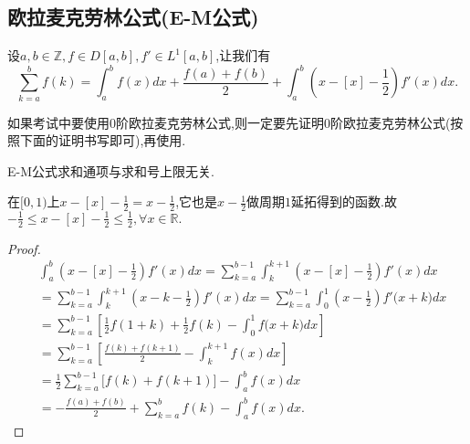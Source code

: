 \documentclass[lang=cn,newtx,10pt,scheme=chinese]{elegantbook}
\begin{document}
\subsection{欧拉麦克劳林公式(E-M公式)}


\begin{proposition}\label{proposition:0阶欧拉麦克劳林公式(0阶E-M公式)}
设\(a,b\in\mathbb{Z}, f\in D[a,b], f'\in L^1[a,b]\),让我们有
\[
\sum_{k = a}^{b}f(k)=\int_{a}^{b}f(x)dx+\frac{f(a)+f(b)}{2}+\int_{a}^{b}\left(x - [x]-\frac{1}{2}\right)f'(x)dx.
\]
\end{proposition}
\begin{remark}
如果考试中要使用0阶欧拉麦克劳林公式,则一定要先证明0阶欧拉麦克劳林公式(按照下面的证明书写即可),再使用.

E-M公式求和通项与求和号上限无关.
\end{remark}
\begin{note}
在\([0,1)\)上\(x - [x]-\frac{1}{2}=x - \frac{1}{2}\),它也是\(x - \frac{1}{2}\)做周期\(1\)延拓得到的函数.故$-\frac{1}{2}\leqslant x-[x]-\frac{1}{2}\leqslant \frac{1}{2},\forall x\in \mathbb{R} .$
\end{note}
\begin{proof}
\begin{align*}
&\int_a^b{\left( x-[x]-\frac{1}{2} \right) f'(x)dx}=\sum_{k=a}^{b-1}{\int_k^{k+1}{\left( x-[x]-\frac{1}{2} \right) f'(x)dx}}
\\
&=\sum_{k=a}^{b-1}{\int_k^{k+1}{\left( x-k-\frac{1}{2} \right) f'(x)dx}}=\sum_{k=a}^{b-1}{\int_0^1{\left( x-\frac{1}{2} \right) f'(x}}+k)dx
\\
&=\sum_{k=a}^{b-1}{\left[ \frac{1}{2}f(1+k)+\frac{1}{2}f(k)-\int_0^1{f(x}+k)dx \right]}
\\
&=\sum_{k=a}^{b-1}{\left[ \frac{f(k)+f(k+1)}{2}-\int_k^{k+1}{f(x)dx} \right]}
\\
&=\frac{1}{2}\sum_{k=a}^{b-1}{[f(k)}+f(k+1)]-\int_a^b{f(x)dx}
\\
&=-\frac{f(a)+f(b)}{2}+\sum_{k=a}^b{f(k)}-\int_a^b{f(x)dx}.
\end{align*}
\end{proof}
\end{document}
